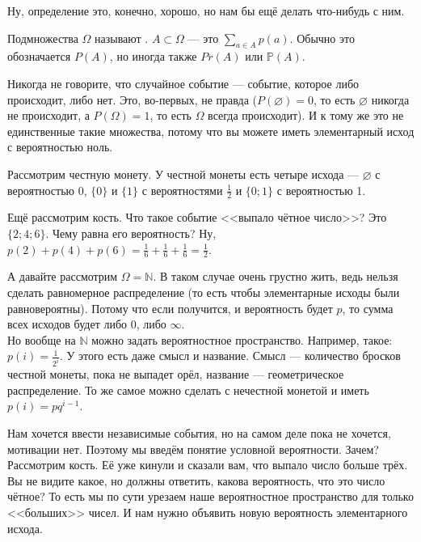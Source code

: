 \documentclass{article}
\begin{document}
\begin{itemize}
        \begin{Comment}
            Ну, определение это, конечно, хорошо, но нам бы ещё делать что-нибудь с ним.
        \end{Comment}
        \dfn Подмножества $\Omega$ называют .  $A\subset\Omega$ --- это $\sum\limits_{a\in A}p(a)$. Обычно это обозначается $P(A)$, но иногда также $Pr(A)$ или $\mathbb P(A)$.
        \begin{Comment}
            Никогда не говорите, что случайное событие --- событие, которое либо происходит, либо нет. Это, во-первых, не правда ($P(\varnothing)=0$, то есть $\varnothing$ никогда не происходит, а $P(\Omega)=1$, то есть $\Omega$ всегда происходит). И к тому же это не единственные такие множества, потому что вы можете иметь элементарный исход с вероятностью ноль.
        \end{Comment}
        \begin{Example}
            Рассмотрим честную монету. У честной монеты есть четыре исхода --- $\varnothing$ с вероятностью 0, $\{0\}$ и $\{1\}$ с вероятностями $\frac12$ и $\{0;1\}$ с вероятностью 1.
        \end{Example}
        \begin{Example}
            Ещё рассмотрим кость. Что такое событие <<выпало чётное число>>? Это $\{2;4;6\}$. Чему равна его вероятность? Ну, $p(2)+p(4)+p(6)=\frac16+\frac16+\frac16=\frac12$.
        \end{Example}
        \begin{Example}
            А давайте рассмотрим $\Omega=\mathbb N$. В таком случае очень грустно жить, ведь нельзя сделать равномерное распределение (то есть чтобы элементарные исходы были равновероятны). Потому что если получится, и вероятность будет $p$, то сумма всех исходов будет либо 0, либо $\infty$.\\
            Но вообще на $\mathbb N$ можно задать вероятностное пространство. Например, такое: $p(i)=\frac1{2^i}$. У этого есть даже смысл и название. Смысл --- количество бросков честной монеты, пока не выпадет орёл, название --- геометрическое распределение. То же самое можно сделать с нечестной монетой и иметь $p(i)=pq^{i-1}$.
        \end{Example}
        \begin{Comment}
            Нам хочется ввести независимые события, но на самом деле пока не хочется, мотивации нет. Поэтому мы введём понятие условной вероятности. Зачем?
            Рассмотрим кость. Её уже кинули и сказали вам, что выпало число больше трёх. Вы не видите какое, но должны ответить, какова вероятность, что это число чётное? То есть мы по сути урезаем наше вероятностное пространство для только <<больших>> чисел. И нам нужно объявить новую вероятность элементарного исхода.

\end{Comment}
\end{itemize}
\end{document}
